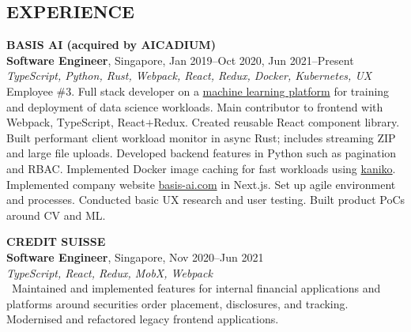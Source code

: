 \documentclass[line, margin]{res}
\makeatletter
\newcommand{\at}[0]{@}
\makeatother
\begin{document}
\address{
    \href{mailto:ng.guoyou+cv\at gmail.com}{ng.guoyou\at gmail.com}
    \href{https://github.com/gyng}{github.com/gyng}
}

\begin{resume}

    \section{EXPERIENCE}
        \textbf{BASIS AI (acquired by AICADIUM)} \\
        \textbf{Software Engineer}, Singapore, Jan 2019--Oct 2020, Jun 2021--Present \\
        \textit{TypeScript, Python, Rust, Webpack, React, Redux, Docker, Kubernetes, UX} \\
        Employee \#3. Full stack developer on a \href{https://docs.basis-ai.com/}{machine learning platform} for training and deployment of data science workloads.
        Main contributor to frontend with Webpack, TypeScript, React$+$Redux. Created reusable React component library.
        Built performant client workload monitor in async Rust; includes streaming ZIP and large file uploads.
        Developed backend features in Python such as pagination and RBAC.
        Implemented Docker image caching for fast workloads using \href{https://github.com/GoogleContainerTools/kaniko}{kaniko}.
        Implemented company website \href{https://basis-ai.com/}{basis-ai.com} in Next.js.
        Set up agile environment and processes.
        Conducted basic UX research and user testing.
        Built product PoCs around CV and ML.
    
        \textbf{CREDIT SUISSE} \\
        \textbf{Software Engineer}, Singapore, Nov 2020--Jun 2021 \\
        \textit{TypeScript, React, Redux, MobX, Webpack} \\\
        Maintained and implemented features for internal financial applications and platforms around securities order placement, disclosures, and tracking. Modernised and refactored legacy frontend applications.


\end{resume}
\end{document}
